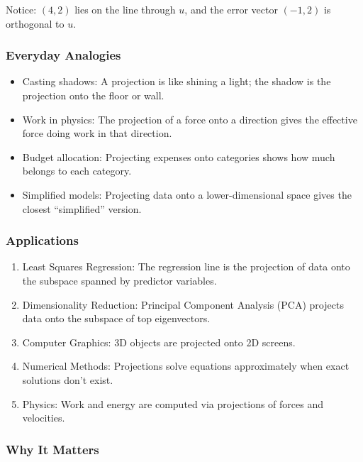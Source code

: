 \documentclass[
  letterpaper,
  DIV=11,
  numbers=noendperiod]{scrreprt}
\providecommand{\tightlist}{%
  \setlength{\itemsep}{0pt}\setlength{\parskip}{0pt}}
\begin{document}
Notice: \((4,2)\) lies on the line through \(u\), and the error vector
\((-1,2)\) is orthogonal to \(u\).

\subsubsection{Everyday Analogies}\label{everyday-analogies-70}

\begin{itemize}
\tightlist
\item
  Casting shadows: A projection is like shining a light; the shadow is
  the projection onto the floor or wall.
\item
  Work in physics: The projection of a force onto a direction gives the
  effective force doing work in that direction.
\item
  Budget allocation: Projecting expenses onto categories shows how much
  belongs to each category.
\item
  Simplified models: Projecting data onto a lower-dimensional space
  gives the closest ``simplified'' version.
\end{itemize}

\subsubsection{Applications}\label{applications-36}

\begin{enumerate}
\def\labelenumi{\arabic{enumi}.}
\tightlist
\item
  Least Squares Regression: The regression line is the projection of
  data onto the subspace spanned by predictor variables.
\item
  Dimensionality Reduction: Principal Component Analysis (PCA) projects
  data onto the subspace of top eigenvectors.
\item
  Computer Graphics: 3D objects are projected onto 2D screens.
\item
  Numerical Methods: Projections solve equations approximately when
  exact solutions don't exist.
\item
  Physics: Work and energy are computed via projections of forces and
  velocities.
\end{enumerate}

\subsubsection{Why It Matters}\label{why-it-matters-70}
\end{document}
